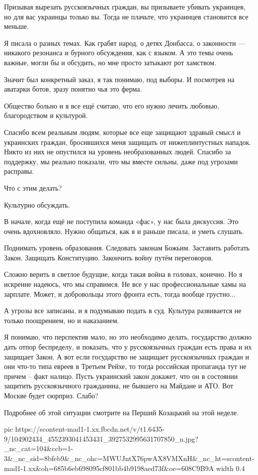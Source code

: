 Призывая вырезать русскоязычных граждан, вы призываете убивать украинцев, но
для вас украинцы только вы. Тогда не плачьте, что украинцев становится все
меньше.

Я писала о разных темах. Как грабят народ, о детях Донбасса, о законности —
никакого резонанса и бурного обсуждения, как с языком. А это темы очень важные,
могли бы и обсудить, но мне просто затыкают рот хамством. 

Значит был конкретный заказ, я так понимаю, под выборы. И посмотрев на аватарки ботов, зразу понятно чья это ферма.

Общество больно и я все ещё считаю, что его нужно лечить любовью, благородством и культурой.

Спасибо всем реальным людям, которые все еще защищают здравый смысл и
украинских граждан, бросившихся меня защищать от нижеплинтустных нападок. Никто
из них не опустился на уровень необразованных людей. Спасибо за поддержку, мы
реально показали, что мы вместе сильны, даже под угрозами расправы.

Что с этим делать?

Культурно обсуждать.

В начале, когда ещё не поступила команда «фас», у нас была дискуссия. Это очень
вдохновляло. Нужно общаться, как я и раньше писала, и уметь слушать.

Поднимать уровень образования.
Следовать законам Божьим.
Заставить работать Закон. 
Защищать Конституцию.
Закончить войну путём переговоров.

Сложно верить в светлое будущие, когда такая война в головах, конечно. Но я
искренне надеюсь, что мы справимся. Не все у нас профессиональные хамы на
зарплате. Может, и добровольцы этого фронта есть, тогда вообще грустно...

А угрозы все записаны, и я подумываю подать в суд. Культура развивается не только поощрением, но и наказанием. 

Я понимаю, что перспектив мало, но это необходимо делать, государство должно
дать отпор беспределу, и показать, что у русскоязычных граждан есть права и их
защищает Закон. А вот если государство не защищает русскоязычных граждан и они
что-то типа евреев в Третьем Рейхе, то тогда российская пропаганда тут не
причем – факт налицо. Пусть украинский закон докажет, что он в состоянии
защитить русскоязычного гражданина, не бывшего на Майдане и АТО. Вот Москве
будет сюрприз. Слабо?

Подробнее об этой ситуации смотрите на Перший Козацький на этой неделе.

\ifcmt
   pic https://scontent-mad1-1.xx.fbcdn.net/v/t1.6435-9/104902434_4552393041453431_3927532995631707850_n.jpg?_nc_cat=104&ccb=1-3&_nc_sid=8bfeb9&_nc_ohc=MWUJntX76pwAX8VMXnH&_nc_ht=scontent-mad1-1.xx&oh=685b6eb698095cf801bb4b9198aed73f&oe=608C9B9A
   width 0.4
\fi
 
